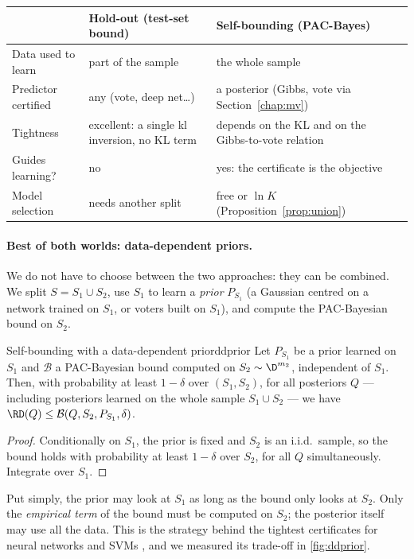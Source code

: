 \begin{center}
\renewcommand{\arraystretch}{1.3}
\begin{tabular}{p{3.2cm}p{4.8cm}p{4.8cm}}
\toprule
& Hold-out (test-set bound) & Self-bounding (PAC-Bayes) \\
\midrule
Data used to learn & part of the sample & the whole sample \\
Predictor certified & any (vote, deep net\dots) & a posterior (Gibbs, vote via Section~\ref{chap:mv}) \\
Tightness & excellent: a single kl inversion, no KL term & depends on the KL and on the Gibbs-to-vote relation \\
Guides learning? & no & yes: the certificate is the objective \\
Model selection & needs another split & free or $\ln K$ (Proposition~\ref{prop:union}) \\
\bottomrule
\end{tabular}
\end{center}

\paragraph{Best of both worlds: data-dependent priors.} We do not have to choose
between the two approaches: they can be combined. We split $S=S_1\cup S_2$, use $S_1$ to learn a \emph{prior} $P_{S_1}$
(a Gaussian centred on a network trained on $S_1$, or voters built on $S_1$),
and compute the PAC-Bayesian bound on $S_2$.

\begin{proposition}{Self-bounding with a data-dependent prior}{ddprior}
Let $P_{S_1}$ be a prior learned on $S_1$ and $\mathcal B$ a PAC-Bayesian bound
computed on $S_2\sim\D^{m_2}$, independent of $S_1$. Then, with probability at least
$1-\delta$ over $(S_1,S_2)$, for all posteriors $Q$ --- including posteriors learned on the whole
sample $S_1\cup S_2$ --- we have $\RD(Q)\leq\mathcal B(Q,S_2,P_{S_1},\delta)$.
\end{proposition}
\begin{proof}
Conditionally on $S_1$, the prior is fixed and $S_2$ is an i.i.d.\ sample, so the
bound holds with probability at least $1-\delta$ over $S_2$, for all $Q$ simultaneously.
Integrate over $S_1$.
\end{proof}

Put simply, the prior may look at $S_1$ as long as the bound only looks at
$S_2$. Only the \emph{empirical term} of the bound must be computed on $S_2$; the
posterior itself may use all the data. This is the strategy behind the tightest
certificates for neural networks \citep{dziugaite2017computing,perez2021tighter}
and SVMs \citep{ambroladze2006tighter,parrado2012pac}, and we measured its
trade-off in \cref{fig:ddprior}.

